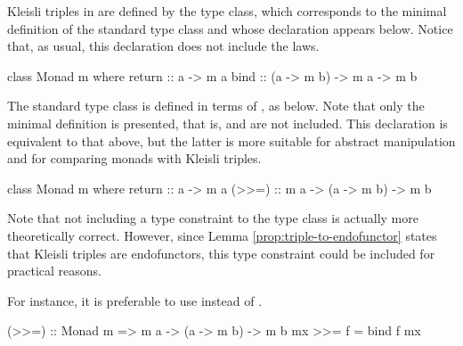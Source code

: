 
Kleisli triples in \hask are defined by the  type
class, which corresponds to the minimal definition of the standard
 type class and whose declaration appears below.
Notice that, as usual, this declaration does not include the laws.
\begin{codehaskell}
class Monad m where
  return :: a -> m a
  bind   :: (a -> m b) -> m a -> m b
\end{codehaskell}

The standard  type class is defined in terms of
\texthaskell{(>>=)}, as below. Note that only the minimal definition
is presented, that is, \texthaskell{(>>)} and  are
not included. This declaration is equivalent to that above, but the
latter is more suitable for abstract manipulation and for comparing
monads with Kleisli triples.
\begin{codehaskell}
class Monad m where
  return :: a -> m a
  (>>=)  :: m a -> (a -> m b) -> m b
\end{codehaskell}

\begin{remark}
  \label{re:triple-endofunctor}

  Note that not including a  type constraint to
  the  type class is actually more theoretically
  correct. However, since Lemma \ref{prop:triple-to-endofunctor}
  states that Kleisli triples are endofunctors, this type constraint
  could be included for practical reasons.

  For instance, it is preferable to use  instead of
  . 

\end{remark}

\begin{codehaskell}
(>>=) :: Monad m => m a -> (a -> m b) -> m b
mx >>= f = bind f mx
\end{codehaskell}


